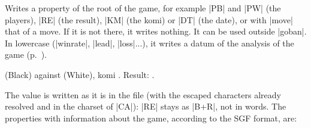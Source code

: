 \begin{command}{\sgfinfo{}}
	Writes a property of the root of the game, for example |PB| and |PW| (the players), |RE| (the result), |KM| (the komi) or |DT| (the date), or with |move| that of a move. If it is not there, it writes nothing. It can be used outside |goban|. In lowercase (|winrate|, |lead|, |loss|...), it writes a datum of the analysis of the game (p.~\pageref{subsec:sgfanalisis}).

	\begin{codeexample}[]
		 (Black) against
		 (White),
		komi .
		Result: .
	\end{codeexample}

	The value is written as it is in the file (with the escaped characters already resolved and in the charset of |CA|): |RE| stays as |B+R|, not in words. The properties with information about the game, according to the SGF format, are:


\end{command}

